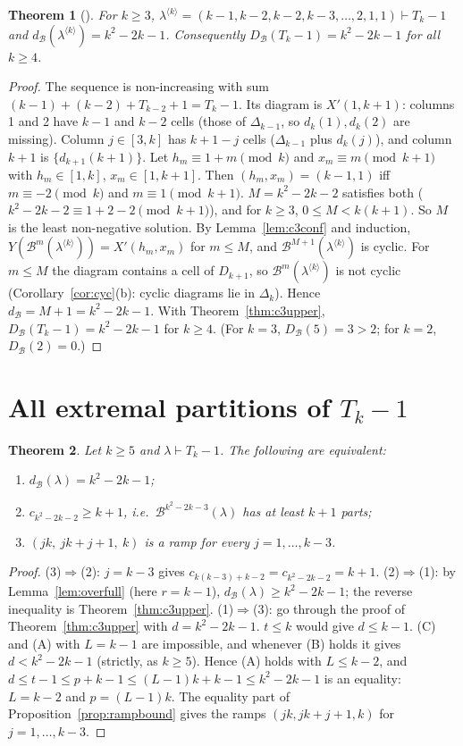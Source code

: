 \documentclass[11pt]{article}
\newtheorem{theorem}{Theorem}[section]
\theoremstyle{definition}
\newcommand{\B}{\mathcal{B}}
\newcommand{\dB}{d_{\mathcal{B}}}
\newcommand{\DB}{D_{\mathcal{B}}}
\renewcommand{\le}{\leqslant}
\renewcommand{\ge}{\geqslant}
\begin{document}
\begin{theorem}[{\cite[Thm.~4.4(2)]{GH}}]\label{thm:c3lower}
For $k\ge3$, $\lambda^{\langle k\rangle}=(k-1,k-2,k-2,k-3,\dots,2,1,1)\vdash T_k-1$ and
$\dB(\lambda^{\langle k\rangle})=k^2-2k-1$.  Consequently $\DB(T_k-1)=k^2-2k-1$ for all $k\ge4$.
\end{theorem}
\begin{proof}
The sequence is non-increasing with sum $(k-1)+(k-2)+T_{k-2}+1=T_k-1$.  Its diagram is $X'(1,k+1)$:
columns 1 and 2 have $k-1$ and $k-2$ cells (those of $\Delta_{k-1}$, so $d_k(1),d_k(2)$ are missing).  Column
$j\in[3,k]$ has $k+1-j$ cells ($\Delta_{k-1}$ plus $d_k(j)$), and column $k+1$ is $\{d_{k+1}(k+1)\}$.  Let
$h_m\equiv1+m\pmod k$ and $x_m\equiv m\pmod{k+1}$ with $h_m\in[1,k]$, $x_m\in[1,k+1]$.  Then
$(h_m,x_m)=(k-1,1)$ iff $m\equiv-2\pmod k$ and $m\equiv1\pmod{k+1}$.  $M=k^2-2k-2$ satisfies both
($k^2-2k-2\equiv1+2-2\pmod{k+1}$), and for $k\ge3$, $0\le M<k(k+1)$.  So $M$ is the least non-negative
solution.  By Lemma~\ref{lem:c3conf} and induction, $Y(\B^m(\lambda^{\langle k\rangle}))=X'(h_m,x_m)$ for $m\le M$,
and $\B^{M+1}(\lambda^{\langle k\rangle})$ is cyclic.  For $m\le M$ the diagram contains a cell of $D_{k+1}$, so
$\B^m(\lambda^{\langle k\rangle})$ is not cyclic (Corollary~\ref{cor:cyc}(b): cyclic diagrams lie in $\Delta_k$).
Hence $\dB=M+1=k^2-2k-1$.  With Theorem~\ref{thm:c3upper}, $\DB(T_k-1)=k^2-2k-1$ for $k\ge4$.  (For $k=3$,
$\DB(5)=3>2$; for $k=2$, $\DB(2)=0$.)
\end{proof}

\section{All extremal partitions of $T_k-1$}\label{sec:c3ext}

\begin{theorem}\label{thm:c3ext}
Let $k\ge5$ and $\lambda\vdash T_k-1$.  The following are equivalent:
\begin{enumerate}
\item[(1)] $\dB(\lambda)=k^2-2k-1$;
\item[(2)] $c_{k^2-2k-2}\ge k+1$, i.e.\ $\B^{k^2-2k-3}(\lambda)$ has at least $k+1$ parts;
\item[(3)] $(jk,\ jk+j+1,\ k)$ is a ramp for every $j=1,\dots,k-3$.
\end{enumerate}
\end{theorem}
\begin{proof}
(3)$\Rightarrow$(2): $j=k-3$ gives $c_{k(k-3)+k-2}=c_{k^2-2k-2}=k+1$.
(2)$\Rightarrow$(1): by Lemma~\ref{lem:overfull} (here $r=k-1$), $\dB(\lambda)\ge k^2-2k-1$; the reverse
inequality is Theorem~\ref{thm:c3upper}.
(1)$\Rightarrow$(3): go through the proof of Theorem~\ref{thm:c3upper} with $d=k^2-2k-1$.  $t\le k$ would give
$d\le k-1$.  (C) and (A) with $L=k-1$ are impossible, and whenever (B) holds it gives $d<k^2-2k-1$
(strictly, as $k\ge5$).  Hence (A) holds with $L\le k-2$, and $d\le t-1\le p+k-1\le(L-1)k+k-1\le k^2-2k-1$ is
an equality: $L=k-2$ and $p=(L-1)k$.  The equality part of Proposition~\ref{prop:rampbound} gives the ramps
$(jk,jk+j+1,k)$ for $j=1,\dots,k-3$.
\end{proof}
\end{document}
